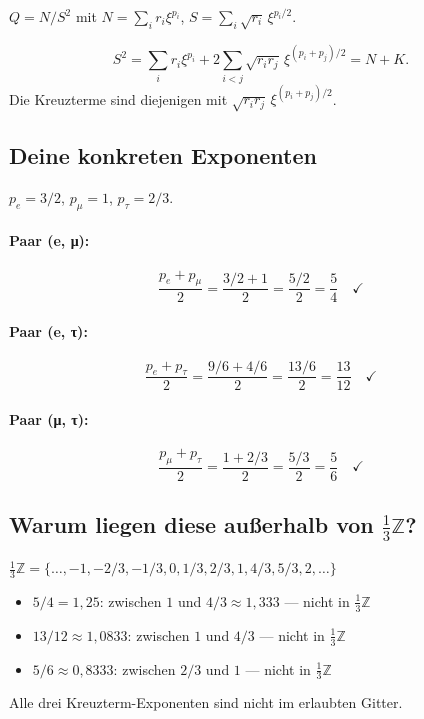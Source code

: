 $Q=N/S^2$ mit $N=\sum_ir_i\xi^{p_i}$, $S=\sum_i\sqrt{r_i}\,\xi^{p_i/2}$.

\[
  S^2 = \sum_ir_i\xi^{p_i}+2\sum_{i<j}\sqrt{r_ir_j}\,\xi^{(p_i+p_j)/2}
  = N+K.
\]
Die Kreuzterme sind diejenigen mit $\sqrt{r_ir_j}\,\xi^{(p_i+p_j)/2}$.

\subsection{Deine konkreten Exponenten}

$p_e=3/2$, $p_\mu=1$, $p_\tau=2/3$.

\paragraph{Paar (e, μ):}
\[
  \frac{p_e+p_\mu}{2} = \frac{3/2+1}{2} = \frac{5/2}{2}
  = \boxed{\frac{5}{4}} \quad\checkmark
\]

\paragraph{Paar (e, τ):}
\[
  \frac{p_e+p_\tau}{2} = \frac{9/6+4/6}{2} = \frac{13/6}{2}
  = \boxed{\frac{13}{12}} \quad\checkmark
\]

\paragraph{Paar (μ, τ):}
\[
  \frac{p_\mu+p_\tau}{2} = \frac{1+2/3}{2} = \frac{5/3}{2}
  = \boxed{\frac{5}{6}} \quad\checkmark
\]

\subsection{Warum liegen diese außerhalb von $\tfrac{1}{3}\mathbb{Z}$?}

$\tfrac{1}{3}\mathbb{Z}=\{\ldots,-1,-2/3,-1/3,0,1/3,2/3,1,4/3,5/3,2,\ldots\}$
\begin{itemize}
  \item $5/4=1{,}25$: zwischen $1$ und $4/3\approx1{,}333$
        — nicht in $\tfrac{1}{3}\mathbb{Z}$
  \item $13/12\approx1{,}0833$: zwischen $1$ und $4/3$
        — nicht in $\tfrac{1}{3}\mathbb{Z}$
  \item $5/6\approx0{,}8333$: zwischen $2/3$ und $1$
        — nicht in $\tfrac{1}{3}\mathbb{Z}$
\end{itemize}
Alle drei Kreuzterm-Exponenten sind nicht im erlaubten Gitter.

